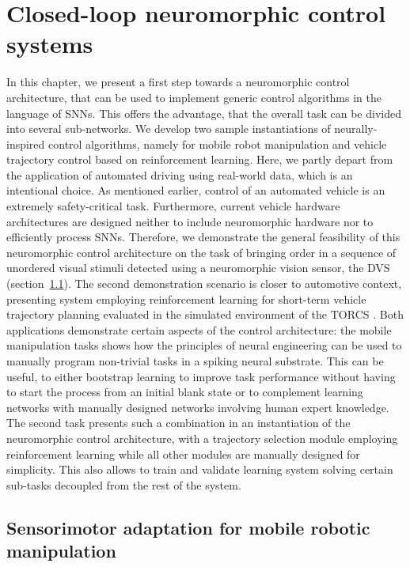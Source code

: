 \chapter{Closed-loop neuromorphic control systems}%
\label{chap:closed_loop_neuromorphic_control_systems}
In this chapter, we present a first step towards a neuromorphic control architecture, that can be used to implement generic control algorithms in the language of \acp{SNN}.
This offers the advantage, that the overall task can be divided into several sub-networks.
We develop two sample instantiations of neurally-inspired control algorithms, namely for mobile robot manipulation and vehicle trajectory control based on reinforcement learning.
Here, we partly depart from the application of automated driving using real-world data, which is an intentional choice.
As mentioned earlier, control of an automated vehicle is an extremely safety-critical task.
Furthermore, current vehicle hardware architectures are designed neither to include neuromorphic hardware nor to efficiently process \acp{SNN}.
Therefore, we demonstrate the general feasibility of this neuromorphic control architecture on the task of bringing order in a sequence of unordered visual stimuli detected using a neuromorphic vision sensor, the \ac{DVS} (section~\ref{sec:sensorimotor_adaptation_for_mobile_robotic_manipulation}). 
The second demonstration scenario is closer to automotive context, presenting system employing reinforcement learning for short-term vehicle trajectory planning evaluated in the simulated environment of the \acf{TORCS} \cite{TORCS}.
Both applications demonstrate certain aspects of the control architecture: the mobile manipulation tasks shows how the principles of neural engineering can be used to manually program non-trivial tasks in a spiking neural substrate.
This can be useful, to either bootstrap learning to improve task performance without having to start the process from an initial blank state or to complement learning networks with manually designed networks involving human expert knowledge.
The second task presents such a combination in an instantiation of the neuromorphic control architecture, with a trajectory selection module employing reinforcement learning while all other modules are manually designed for simplicity.
This also allows to train and validate learning system solving certain sub-tasks decoupled from the rest of the system.


\section{Sensorimotor adaptation for mobile robotic manipulation}%
\label{sec:sensorimotor_adaptation_for_mobile_robotic_manipulation}

